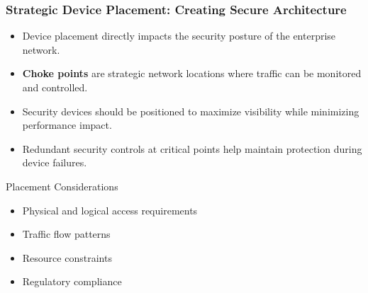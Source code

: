 \documentclass{beamer}
\begin{document}
\begin{frame}
    \frametitle{Strategic Device Placement: Creating Secure Architecture}
    \begin{itemize}
        \item Device placement directly impacts the security posture of the enterprise network.
        \item \textbf{Choke points} are strategic network locations where traffic can be monitored and controlled.
        \item Security devices should be positioned to maximize visibility while minimizing performance impact.
        \item Redundant security controls at critical points help maintain protection during device failures.
    \end{itemize}
    
    \begin{block}{Placement Considerations}
        \begin{itemize}
            \item Physical and logical access requirements
            \item Traffic flow patterns
            \item Resource constraints
            \item Regulatory compliance
        \end{itemize}
    \end{block}
\end{frame}
\end{document}
